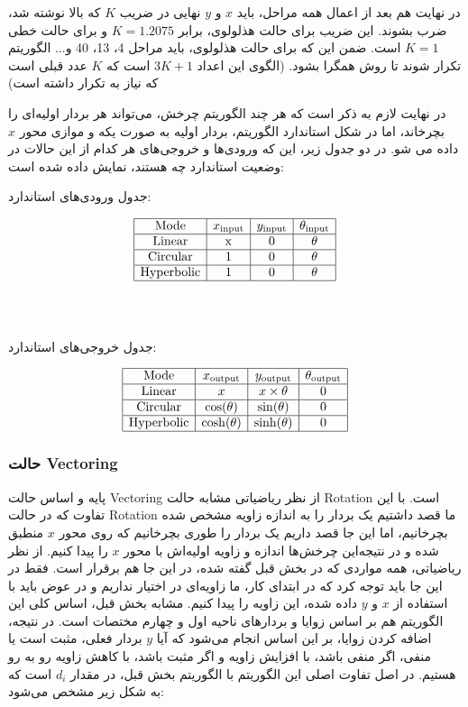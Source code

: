 \documentclass[12pt,titlepage,a4page , tikz , multi,table , svgnames,xcdraw]{article}
\begin{document}
در نهایت هم بعد از اعمال همه مراحل، باید $x$ و $y$ نهایی در ضریب $K$ که بالا نوشته شد، ضرب بشوند. این ضریب برای حالت هذلولوی، برابر $K = 1.2075$ و برای حالت خطی $K=1$ است. ضمن این که برای حالت هذلولوی، باید مراحل 4، 13، 40 و... الگوریتم تکرار شوند تا روش همگرا بشود. (الگوی این اعداد $3K+1$ است که $K$ عدد قبلی است که نیاز به تکرار داشته است)

در نهایت لازم به ذکر است که هر چند الگوریتم چرخش، می‌تواند هر بردار اولیه‌ای را بچرخاند، اما در شکل استاندارد الگوریتم، بردار اولیه به صورت یکه و موازی محور $x$ داده می شو. در دو جدول زیر، این که ورودی‌ها و خروجی‌های هر کدام از این حالات در وضعیت استاندارد چه هستند، نمایش داده شده است:

\begin{center}
جدول ورودی‌های استاندارد:
\end{center}
$$\begin{array}{|c|c|c|c|}
\hline \text { Mode } & x_{\text {input}} & y_{\text {input}} & \theta_{\text {input}} \\
\hline \text {Linear} & \mathrm{x} & 0 & \mathrm{\theta} \\
\hline \text {Circular} & 1 & 0 & \mathrm{\theta} \\
\hline \text {Hyperbolic} & 1 & 0 & \mathrm{\theta} \\
\hline
\end{array}$$
\\
\\
\begin{center}
جدول خروجی‌های استاندارد:
\end{center}
$$\begin{array}{|c|c|c|c|}
\hline \text { Mode } & x_{\text {output}} & y_{\text {output}} & \theta_{\text {output}} \\
\hline \text {Linear} & x & x \times \theta & 0 \\
\hline \text {Circular} & \cos (\theta) & \sin (\theta) & 0 \\
\hline \text {Hyperbolic} & \cosh (\theta) & \sinh (\theta) & 0 \\
\hline
\end{array}$$

\subsubsection{حالت Vectoring}

پایه و اساس حالت Vectoring از نظر ریاضیاتی مشابه حالت Rotation است. با این تفاوت که در حالت Rotation ما قصد داشتیم یک بردار را به اندازه زاویه مشخص شده بچرخانیم، اما این جا قصد داریم یک بردار را طوری بچرخانیم که روی محور $x$ منطبق شده و در نتیجه‌این چرخش‌ها اندازه و زاویه اولیه‌اش با محور $x$ را پیدا کنیم. از نظر ریاضیاتی، همه مواردی که در بخش قبل گفته شده، در این جا هم برقرار است. فقط در این جا باید توجه کرد که در ابتدای کار، ما زاویه‌ای در اختیار نداریم و در عوض باید با استفاده از $x$ و $y$ داده شده، این زاویه را پیدا کنیم. مشابه بخش قبل، اساس کلی این الگوریتم هم بر اساس زوایا و بردارهای ناحیه اول و چهارم مختصات است. در نتیجه، اضافه کردن زوایا، بر این اساس انجام می‌شود که آیا $y$ بردار فعلی، مثبت است یا منفی، اگر منفی باشد، با افزایش زاویه و اگر مثبت باشد، با کاهش زاویه رو به رو هستیم. در اصل تفاوت اصلی این الگوریتم با الگوریتم بخش قبل، در مقدار $d_i$ است که به شکل زیر مشخص می‌شود:
\end{document}
